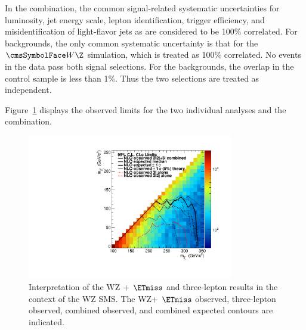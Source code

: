 In the combination, the common signal-related systematic uncertainties
for luminosity, jet energy scale, lepton identification, trigger efficiency, and
misidentification of light-flavor jets as \bjetsnohyphen are 
considered to be 100\% correlated. For backgrounds, the only common systematic uncertainty
is that for the $\W\Z$ simulation, which is treated as 100\% correlated.  No
events in the data pass both signal selections.  For the backgrounds,
the overlap in the control sample is less than 1\%.  Thus the two
selections are treated as independent.

Figure~\ref{fig:WZetmiss} displays the observed limits for the
two individual analyses and the combination.  

\begin{figure}[htp]
\begin{center}
\includegraphics[width=0.8\textwidth]{plots/exclusions/exclusion_TChiWZ_2l2jucla.pdf}
\caption{Interpretation of the WZ + $\ETmiss$ and three-lepton results in the context of the WZ 
SMS. The WZ+ $\ETmiss$ observed, three-lepton observed, combined observed, and combined
expected contours are indicated.}
\label{fig:WZetmiss}
\end{center}
\end{figure}




